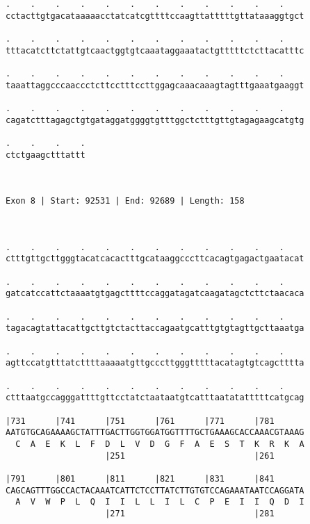 \documentclass{article}
\begin{document}
\begin{Verbatim}
.    .    .    .    .    .    .    .    .    .    .    .    
cctacttgtgacataaaaacctatcatcgttttccaagttatttttgttataaaggtgct
                                                            
.    .    .    .    .    .    .    .    .    .    .    .    
tttacatcttctattgtcaactggtgtcaaataggaaatactgtttttctcttacatttc
                                                            
.    .    .    .    .    .    .    .    .    .    .    .    
taaattaggcccaaccctcttcctttccttggagcaaacaaagtagtttgaaatgaaggt
                                                            
.    .    .    .    .    .    .    .    .    .    .    .    
cagatctttagagctgtgataggatggggtgtttggctctttgttgtagagaagcatgtg
                                                            
.    .    .    .
ctctgaagctttattt
                
                
 
Exon 8 | Start: 92531 | End: 92689 | Length: 158



.    .    .    .    .    .    .    .    .    .    .    .    
ctttgttgcttgggtacatcacactttgcataaggcccttcacagtgagactgaatacat
                                                            
.    .    .    .    .    .    .    .    .    .    .    .    
gatcatccattctaaaatgtgagcttttccaggatagatcaagatagctcttctaacaca
                                                            
.    .    .    .    .    .    .    .    .    .    .    .    
tagacagtattacattgcttgtctacttaccagaatgcatttgtgtagttgcttaaatga
                                                            
.    .    .    .    .    .    .    .    .    .    .    .    
agttccatgtttatcttttaaaaatgttgcccttgggtttttacatagtgtcagctttta
                                                            
.    .    .    .    .    .    .    .    .    .    .    .    
ctttaatgccagggattttgttcctatctaataatgtcatttaatatatttttcatgcag
                                                            
|731      |741      |751      |761      |771      |781      
AATGTGCAGAAAAGCTATTTGACTTGGTGGATGGTTTTGCTGAAAGCACCAAACGTAAAG
  C  A  E  K  L  F  D  L  V  D  G  F  A  E  S  T  K  R  K  A
                    |251                          |261      
  
|791      |801      |811      |821      |831      |841      
CAGCAGTTTGGCCACTACAAATCATTCTCCTTATCTTGTGTCCAGAAATAATCCAGGATA
  A  V  W  P  L  Q  I  I  L  L  I  L  C  P  E  I  I  Q  D  I
                    |271                          |281      
  

\end{Verbatim}
\end{document}
